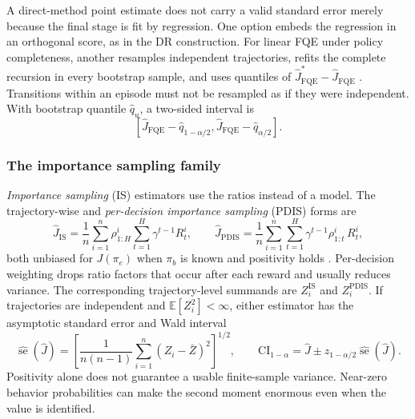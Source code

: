 A direct-method point estimate does not carry a valid standard error merely because the final stage is fit by regression. One option embeds the regression in an orthogonal score, as in the DR construction. For linear FQE under policy completeness, another resamples independent trajectories, refits the complete recursion in every bootstrap sample, and uses quantiles of $\hat J_{\mathrm{FQE}}^*-\hat J_{\mathrm{FQE}}$ \citep{hao2021bootstrapfqe}. Transitions within an episode must not be resampled as if they were independent. With bootstrap quantile $\hat q_u$, a two-sided interval is
\[
\left[
\hat J_{\mathrm{FQE}}-\hat q_{1-\alpha/2},
\hat J_{\mathrm{FQE}}-\hat q_{\alpha/2}
\right].
\]

\subsubsection*{The importance sampling family}

\emph{Importance sampling} (IS) estimators use the ratios instead of a model. The trajectory-wise and \emph{per-decision importance sampling} (PDIS) forms are
\begin{equation}
\hat{J}_{\mathrm{IS}} = \frac{1}{n} \sum_{i=1}^{n} \rho^i_{1:H} \sum_{t=1}^{H} \gamma^{t-1} R^i_t,
\qquad
\hat{J}_{\mathrm{PDIS}} = \frac{1}{n} \sum_{i=1}^{n} \sum_{t=1}^{H} \gamma^{t-1} \rho^i_{1:t}\, R^i_t,
\label{eq:ope_is}
\end{equation}
both unbiased for $J(\pi_e)$ when $\pi_b$ is known and positivity holds \citep{precup2000, jiangli2016doubly}. Per-decision weighting drops ratio factors that occur after each reward and usually reduces variance. The corresponding trajectory-level summands are $Z_i^{\mathrm{IS}}$ and $Z_i^{\mathrm{PDIS}}$. If trajectories are independent and $\mathbb E[Z_i^2]<\infty$, either estimator has the asymptotic standard error and Wald interval
\begin{equation}
\widehat{\operatorname{se}}(\hat J)
=\left[
\frac{1}{n(n-1)}
\sum_{i=1}^{n}(Z_i-\bar Z)^2
\right]^{1/2},
\qquad
\mathrm{CI}_{1-\alpha}
=\hat J\pm z_{1-\alpha/2}\widehat{\operatorname{se}}(\hat J).
\label{eq:ope_is_se}
\end{equation}
Positivity alone does not guarantee a usable finite-sample variance. Near-zero behavior probabilities can make the second moment enormous even when the value is identified.

